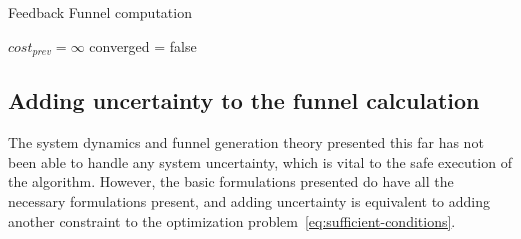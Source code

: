 \begin{algorithm}[H]
  \caption{Feedback Funnel computation}
  \label{alg:funnelalgorithm-extended}
  \DontPrintSemicolon \SetAlgoNoLine

   

  \(cost_{prev} = \infty\)\; converged = false \; \;
\end{algorithm}


\subsection{Adding uncertainty to the funnel calculation}
\label{sec:adding-uncertainty}

The system dynamics and funnel generation theory presented this far has not been
able to handle any system uncertainty, which is vital to the safe execution of
the \rrtfunnel{} algorithm. However, the basic formulations presented do have
all the necessary formulations present, and adding uncertainty is equivalent to
adding another constraint to the optimization
problem~\cref{eq:sufficient-conditions}.

